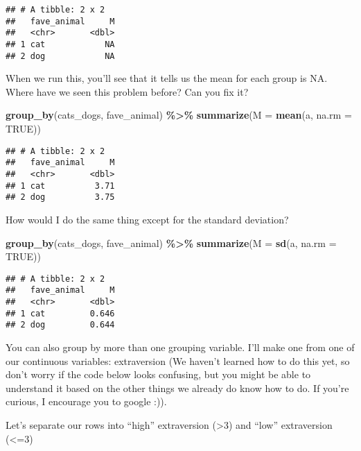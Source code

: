 \documentclass[
]{article}
\newenvironment{Shaded}{\begin{snugshade}}{\end{snugshade}}
\newcommand{\AttributeTok}[1]{\textcolor[rgb]{0.13,0.29,0.53}{#1}}
\newcommand{\ConstantTok}[1]{\textcolor[rgb]{0.56,0.35,0.01}{#1}}
\newcommand{\FunctionTok}[1]{\textcolor[rgb]{0.13,0.29,0.53}{\textbf{#1}}}
\newcommand{\NormalTok}[1]{#1}
\newcommand{\SpecialCharTok}[1]{\textcolor[rgb]{0.81,0.36,0.00}{\textbf{#1}}}
\begin{document}
\begin{verbatim}
## # A tibble: 2 x 2
##   fave_animal     M
##   <chr>       <dbl>
## 1 cat            NA
## 2 dog            NA
\end{verbatim}

When we run this, you'll see that it tells us the mean for each group is
NA. Where have we seen this problem before? Can you fix it?

\begin{Shaded}
\begin{Highlighting}[]
\FunctionTok{group\_by}\NormalTok{(cats\_dogs, fave\_animal) }\SpecialCharTok{\%\textgreater{}\%} 
  \FunctionTok{summarize}\NormalTok{(}\AttributeTok{M =} \FunctionTok{mean}\NormalTok{(a, }\AttributeTok{na.rm =} \ConstantTok{TRUE}\NormalTok{))}
\end{Highlighting}
\end{Shaded}

\begin{verbatim}
## # A tibble: 2 x 2
##   fave_animal     M
##   <chr>       <dbl>
## 1 cat          3.71
## 2 dog          3.75
\end{verbatim}

How would I do the same thing except for the standard deviation?

\begin{Shaded}
\begin{Highlighting}[]
\FunctionTok{group\_by}\NormalTok{(cats\_dogs, fave\_animal) }\SpecialCharTok{\%\textgreater{}\%} 
  \FunctionTok{summarize}\NormalTok{(}\AttributeTok{M =} \FunctionTok{sd}\NormalTok{(a, }\AttributeTok{na.rm =} \ConstantTok{TRUE}\NormalTok{))}
\end{Highlighting}
\end{Shaded}

\begin{verbatim}
## # A tibble: 2 x 2
##   fave_animal     M
##   <chr>       <dbl>
## 1 cat         0.646
## 2 dog         0.644
\end{verbatim}

You can also group by more than one grouping variable. I'll make one
from one of our continuous variables: extraversion (We haven't learned
how to do this yet, so don't worry if the code below looks confusing,
but you might be able to understand it based on the other things we
already do know how to do. If you're curious, I encourage you to google
:)).

Let's separate our rows into ``high'' extraversion (\textgreater3) and
``low'' extraversion (\textless=3)
\end{document}
